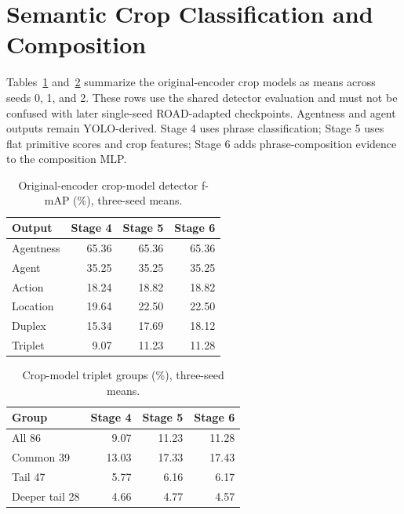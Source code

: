 \section{Semantic Crop Classification and Composition}

Tables~\ref{tab:crop-all} and~\ref{tab:crop-tail} summarize the original-encoder crop models as means across seeds 0, 1, and 2. These rows use the shared detector evaluation and must not be confused with later single-seed ROAD-adapted checkpoints. Agentness and agent outputs remain YOLO-derived. Stage 4 uses phrase classification; Stage 5 uses flat primitive scores and crop features; Stage 6 adds phrase-composition evidence to the composition MLP.

\begin{table}[htbp]
\centering
\caption{Original-encoder crop-model detector f-mAP (\%), three-seed means.}
\label{tab:crop-all}
\begin{singlespace}
\begin{tabular}{@{}lrrr@{}}
\toprule
\textbf{Output} & \textbf{Stage 4} & \textbf{Stage 5} & \textbf{Stage 6} \\
\midrule
Agentness & 65.36 & 65.36 & 65.36 \\
Agent & 35.25 & 35.25 & 35.25 \\
Action & 18.24 & 18.82 & 18.82 \\
Location & 19.64 & 22.50 & 22.50 \\
Duplex & 15.34 & 17.69 & 18.12 \\
Triplet & 9.07 & 11.23 & 11.28 \\
\bottomrule
\end{tabular}
\end{singlespace}
\end{table}

\begin{table}[htbp]
\centering
\caption{Crop-model triplet groups (\%), three-seed means.}
\label{tab:crop-tail}
\begin{singlespace}
\begin{tabular}{@{}lrrr@{}}
\toprule
\textbf{Group} & \textbf{Stage 4} & \textbf{Stage 5} & \textbf{Stage 6} \\
\midrule
All 86 & 9.07 & 11.23 & 11.28 \\
Common 39 & 13.03 & 17.33 & 17.43 \\
Tail 47 & 5.77 & 6.16 & 6.17 \\
Deeper tail 28 & 4.66 & 4.77 & 4.57 \\
\bottomrule
\end{tabular}
\end{singlespace}
\end{table}

